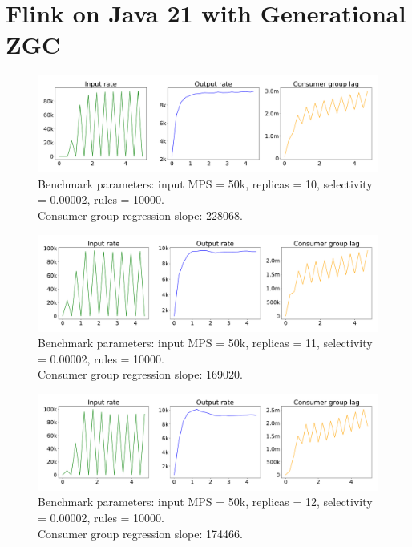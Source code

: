 \newpage

\section{Flink on Java 21 with Generational ZGC}\label{sec:flink-on-java-21-with-generational-zgc}

\begin{figure}[H]
    \centering
    \includegraphics[width=1\textwidth]{figures/flink-java-21-new-gc-replicas-10}
    \caption{Benchmark parameters: input MPS = 50k, replicas = 10, selectivity = 0.00002, rules = 10000. \\
    Consumer group regression slope: 228068.}
    \label{fig:flink-java-21-new-gc-replicas-10}
\end{figure}

\begin{figure}[H]
    \centering
    \includegraphics[width=1\textwidth]{figures/flink-java-21-new-gc-replicas-11}
    \caption{Benchmark parameters: input MPS = 50k, replicas = 11, selectivity = 0.00002, rules = 10000. \\
    Consumer group regression slope: 169020.}
    \label{fig:flink-java-21-new-gc-replicas-11}
\end{figure}

\begin{figure}[H]
    \centering
    \includegraphics[width=1\textwidth]{figures/flink-java-21-new-gc-replicas-12}
    \caption{Benchmark parameters: input MPS = 50k, replicas = 12, selectivity = 0.00002, rules = 10000. \\
    Consumer group regression slope: 174466.}
    \label{fig:flink-java-21-new-gc-replicas-12}
\end{figure}



